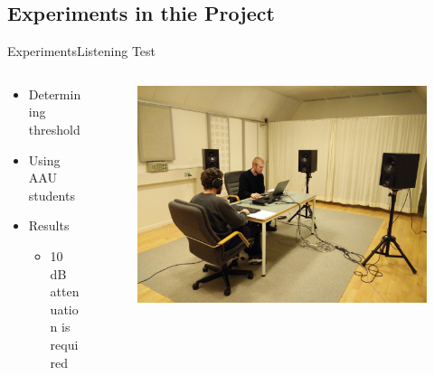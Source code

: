 \subsection{Experiments in thie Project}
\begin{frame}{Experiments}{Listening Test}		
	\begin{columns}
		\begin{column}{0.5\textwidth}
			\begin{itemize}
				\item Determining threshold
				\item Using AAU students
				\item Results
				\begin{itemize}
					\item 10 dB attenuation is required
				\end{itemize}
			\end{itemize}	
		\end{column}	
		\begin{column}{0.5\textwidth} 
			\begin{figure}
					\includegraphics[width=1\textwidth]{figures/ListeningTestSetup.jpg}
			\end{figure}
		\end{column}
	\end{columns}
\end{frame}


